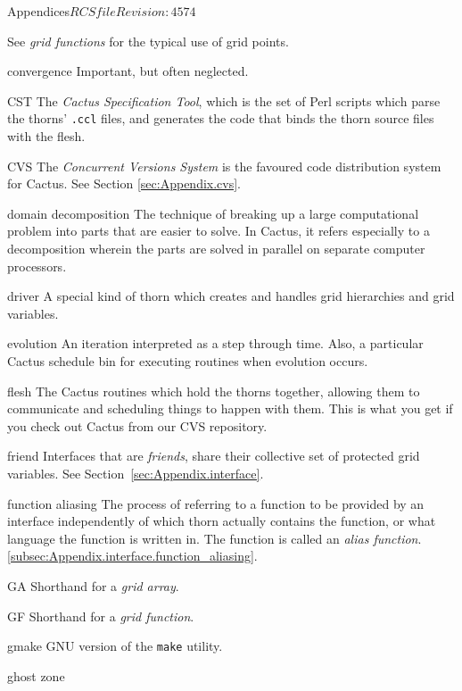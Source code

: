 \begin{cactuspart}{Appendices}{$RCSfile$}{$Revision: 4574 $}
\begin{Lentry}
  See \textit{grid functions} for the typical use of grid points.
\item[convergence]
  Important, but often neglected.
\item[CST]
  The \textit{Cactus Specification Tool}, which is the set of Perl
  scripts which parse the thorns' \texttt{.ccl} files, and generates the
  code that binds the thorn source files with the flesh.
\item[CVS]
  The \textit{Concurrent Versions System} is the favoured code
  distribution system for Cactus.
  See Section %
  \ref{sec:Appendix.cvs}.
\item[domain decomposition]
  The technique of breaking up a large computational problem into parts
  that are easier to solve.  In Cactus, it refers especially to a decomposition
  wherein the parts are solved in parallel on separate computer processors.
\item[driver]
  A special kind of thorn which creates and handles grid hierarchies 
  and grid variables.
\item[evolution]
  An iteration interpreted as a step through time.  Also, a particular Cactus
  schedule bin for executing routines when evolution occurs.
\item[flesh]
  The Cactus routines which hold the thorns together, allowing them to 
  communicate and scheduling things to happen with them. This is what you
  get if you check out Cactus from our CVS repository.
\item[friend] Interfaces that are \textit{friends}, share their collective
  set of protected grid variables.
  See Section~\ref{sec:Appendix.interface}. %
\item[function aliasing]
  The process of referring to a function to be provided by an interface
  independently of which thorn actually contains the function, or what
  language the function is written in.  The function is called an
  \textit{alias function}.%
  \ref{subsec:Appendix.interface.function_aliasing}.
\item[GA]
  Shorthand for a \textit{grid array}.
\item[GF]
  Shorthand for a \textit{grid function}.
\item[gmake]
  GNU version of the {\tt make} utility.
\item[ghost zone] 

\end{Lentry}
\end{cactuspart}
